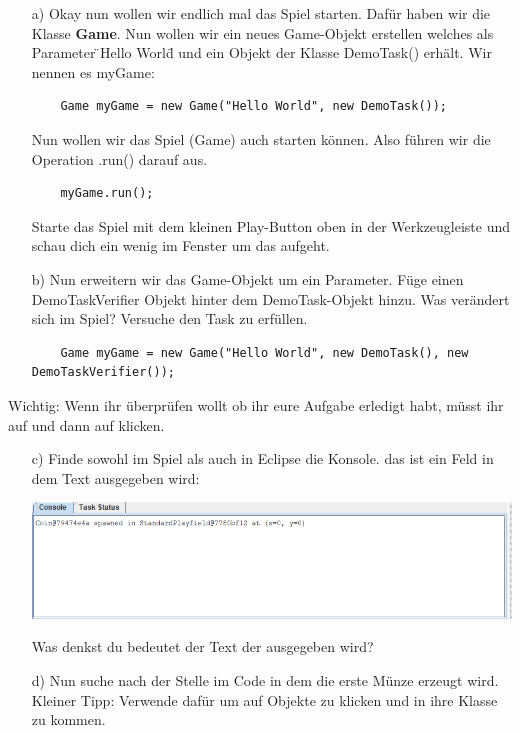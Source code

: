 

\begin{enumerate}
    \item[a)] Okay nun wollen wir endlich mal das Spiel starten. Dafür haben wir die Klasse \textbf{Game}. Nun wollen wir ein neues Game-Objekt erstellen welches als Parameter \"{}Hello World\"{} und ein Objekt der Klasse DemoTask() erhält. Wir nennen es myGame:
    
    \begin{lstlisting}
    Game myGame = new Game("Hello World", new DemoTask());
    \end{lstlisting}
    
    Nun wollen wir das Spiel (Game) auch starten können. Also führen wir die Operation .run() darauf aus. 
    
    \begin{lstlisting}
    myGame.run();
    \end{lstlisting}
    
    Starte das Spiel mit dem kleinen Play-Button oben in der Werkzeugleiste und schau dich ein wenig im Fenster um das aufgeht.
    
    \item[b)] Nun erweitern wir das Game-Objekt um ein Parameter. Füge einen DemoTaskVerifier Objekt hinter dem DemoTask-Objekt hinzu. Was verändert sich im Spiel? Versuche den Task zu erfüllen.
    
    \begin{lstlisting}
    Game myGame = new Game("Hello World", new DemoTask(), new DemoTaskVerifier());
    \end{lstlisting}
    
    \end{enumerate}
    \begin{Infobox}
    Wichtig: Wenn ihr überprüfen wollt ob ihr eure Aufgabe erledigt habt, müsst ihr auf  und dann auf  klicken.
    \end{Infobox}
    \begin{enumerate}
    
    \item[c)] Finde sowohl im Spiel als auch in Eclipse die Konsole. das ist ein Feld in dem Text ausgegeben wird:
    \begin{center}
        \includegraphics[scale=0.5]{sheets/1/figures/console.PNG}
    \end{center}
    
    Was denkst du bedeutet der Text der ausgegeben wird?
    
    \item[d)] Nun suche nach der Stelle im Code in dem die erste Münze erzeugt wird. Kleiner Tipp: Verwende dafür  um auf Objekte zu klicken und in ihre Klasse zu kommen.
\end{enumerate}
